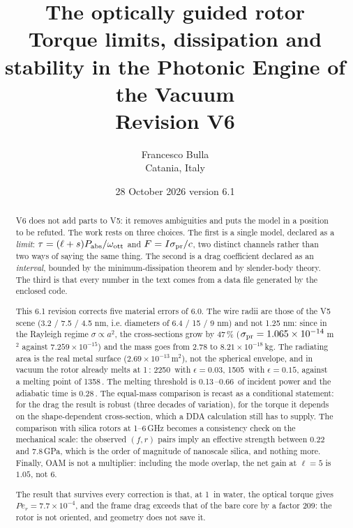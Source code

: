 \documentclass[11pt,a4paper]{article}
\title{\bfseries The optically guided rotor\\[0.3em]
\large Torque limits, dissipation and stability in the Photonic Engine of the Vacuum\\
\large Revision V6}
\author{Francesco Bulla\\ \small Catania, Italy}
\date{28 October 2026 \quad \small version 6.1}
\providecommand{\micro}{\textmu}
\providecommand{\SI}[2]{#1\,\text{#2}}
\begin{document}
\maketitle

\begin{abstract}
\noindent
V6 does not add parts to V5: it removes ambiguities and puts the model in a position
to be refuted. The work rests on three choices. The first is a single model,
declared as a \emph{limit}: $\tau=(\ell+s)P_{\rm abs}/\omega_{\rm ott}$ and
$F=I\sigma_{\rm pr}/c$, two distinct channels rather than two ways of saying the same
thing. The second is a drag coefficient declared as an \emph{interval}, bounded by
the minimum-dissipation theorem and by slender-body theory. The third is that every
number in the text comes from a data file generated by the enclosed code.

This 6.1 revision corrects five material errors of 6.0. The wire radii are those of
the V5 scene (3.2 / 7.5 / 4.5 nm, i.e. diameters of 6.4 / 15 / 9 nm) and not
1.25 nm: since in the Rayleigh regime $\sigma\propto a^2$, the cross-sections grow by
47\,\% ($\sigma_{\rm pr}=1.065\times10^{-14}$\,m$^2$ against $7.259\times10^{-15}$)
and the mass goes from $2.78$ to $8.21\times10^{-18}$\,kg. The radiating area is the
real metal surface ($2.69\times10^{-13}$\,m$^2$), not the spherical envelope, and in
vacuum the rotor already melts at \SI{1}{\micro W}: \SI{2250}{K} with
$\epsilon=0.03$, \SI{1505}{K} with $\epsilon=0.15$, against a melting point of
\SI{1358}{K}. The melting threshold is \SI{0.13}{}--\SI{0.66}{\micro W} of incident
power and the adiabatic time is \SI{0.28}{ms}. The equal-mass comparison is recast as
a conditional statement: for the drag the result is robust (three decades of
variation), for the torque it depends on the shape-dependent cross-section, which a
DDA calculation still has to supply. The comparison with silica rotors at 1--6\,GHz
becomes a consistency check on the mechanical scale: the observed $(f,r)$ pairs imply
an effective strength between $0.22$ and $7.8$\,GPa, which is the order of magnitude
of nanoscale silica, and nothing more. Finally, OAM is not a multiplier: including
the mode overlap, the net gain at $\ell=5$ is $1.05$, not $6$.

The result that survives every correction is that, at \SI{1}{\micro W} in water, the
optical torque gives $Pe_r=7.7\times10^{-4}$, and the frame drag exceeds that of the
bare core by a factor 209: the rotor is not oriented, and geometry does not save it.
\end{abstract}
\end{document}
